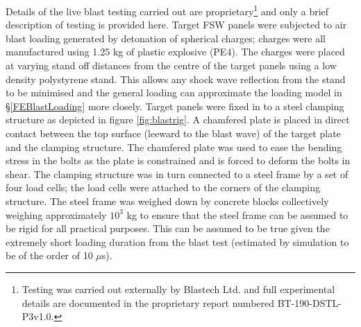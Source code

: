 Details of the live blast testing carried out are proprietary\footnote{Testing was carried out externally by Blastech Ltd. and full experimental details are documented in the proprietary report numbered BT-190-DSTL-P3v1.0.} and only a brief description of testing is provided here. Target FSW panels were subjected to air blast loading generated by detonation of spherical charges; charges were all manufactured using 1.25 kg of plastic explosive (PE4). The charges were placed at varying stand off distances from the centre of the target panels using a low density polystyrene stand. This allows any shock wave reflection from the stand to be minimised and the general loading can approximate the loading model in \S\ref{FEBlastLoading} more closely. Target panels were fixed in to a steel clamping structure as depicted in figure \ref{fig:blastrig}. A chamfered plate is placed in direct contact between the top surface (leeward to the blast wave) of the target plate and the clamping structure. The chamfered plate was used to ease the bending stress in the bolts as the plate is constrained and is forced to deform the bolts in shear. The clamping structure was in turn connected to a steel frame by a set of four load cells; the load cells were attached to the corners of the clamping structure. The steel frame was weighed down by concrete blocks collectively weighing approximately $10^3$ kg to ensure that the steel frame can be assumed to be rigid for all practical purposes. This can be assumed to be true given the extremely short loading duration from the blast test (estimated by simulation to be of the order of 10 $\mu$s).
